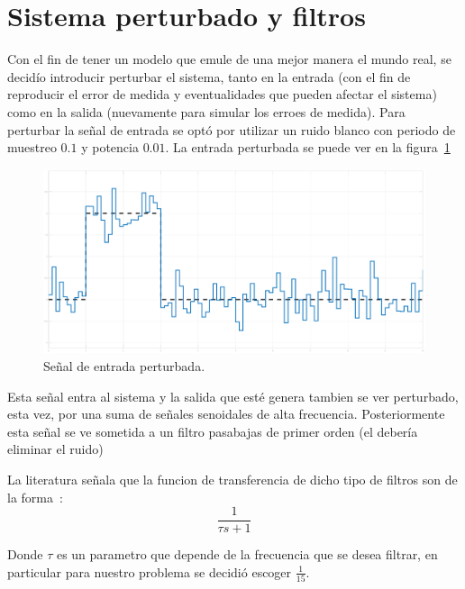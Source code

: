 \section{Sistema perturbado y filtros}
Con el fin de tener un modelo que emule de una mejor manera el mundo real,
se decidío introducir perturbar el sistema, tanto en la entrada (con el fin
de reproducir el error de medida y eventualidades que pueden afectar el
sistema) como en la salida (nuevamente para simular los erroes de medida).
Para perturbar la señal de entrada se optó por utilizar un ruido blanco
con periodo de muestreo $0.1$ y potencia $0.01$. La entrada perturbada se puede
ver en la figura~\ref{fig:entrada-ruido}

\begin{figure}[t]
  \label{fig:entrada-ruido}
  \includegraphics[scale=1]{Figuras/entrada}
  \caption{Señal de entrada perturbada.} 
\end{figure}

Esta señal entra al sistema y la salida que esté genera tambien se ver
perturbado, esta vez, por una suma de señales senoidales de alta frecuencia.
Posteriormente esta señal se ve sometida a un filtro pasabajas de primer orden
(el debería eliminar el ruido)

La literatura señala que la funcion de transferencia de dicho tipo de filtros
son de la forma~\citep{filtros}:
\[
\frac{1}{\tau s + 1}
\]

Donde $\tau $ es un parametro que depende de la frecuencia que se desea filtrar,
en particular para nuestro problema se decidió escoger $\frac{1}{15}$.

